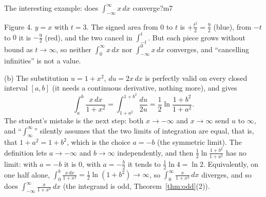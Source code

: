 \documentclass[11pt]{article}
\begin{document}
\begin{exmp}{The interesting example: does $\int_{-\infty}^\infty x\,dx$ converge?}{m7}
\begin{center}
\end{center}
\begin{center}\small Figure 4. $y=x$ with $t=3$. The signed area from $0$ to $t$ is $+\frac{t^2}2=\frac92$ (blue), from $-t$ to $0$ it is $-\frac92$ (red), and the two cancel in $\int_{-t}^t$. But each piece grows without bound as $t\to\infty$, so neither $\int_0^\infty x\,dx$ nor $\int_{-\infty}^0x\,dx$ converges, and ``cancelling infinities'' is not a value.\end{center}

(b) The substitution $u=1+x^2$, $du=2x\,dx$ is perfectly valid on every closed interval $[a,b]$ (it needs a continuous derivative, nothing more), and gives
\[\int_a^b\frac{x\,dx}{1+x^2}=\int_{1+a^2}^{1+b^2}\frac{du}{2u}=\frac12\ln\frac{1+b^2}{1+a^2}.\]
The student's mistake is the next step: both $x\to-\infty$ and $x\to\infty$ send $u$ to $\infty$, and ``$\int_\infty^\infty$'' silently assumes that the two limits of integration are equal, that is, that $1+a^2=1+b^2$, which is the choice $a=-b$ (the symmetric limit). The definition lets $a\to-\infty$ and $b\to\infty$ independently, and then $\frac12\ln\frac{1+b^2}{1+a^2}$ has no limit: with $a=-b$ it is $0$, with $a=-\frac b2$ it tends to $\frac12\ln4=\ln2$. Equivalently, on one half alone, $\int_0^b\frac{x\,dx}{1+x^2}=\frac12\ln(1+b^2)\to\infty$, so $\int_0^\infty\frac x{1+x^2}\,dx$ diverges, and so does $\int_{-\infty}^\infty\frac x{1+x^2}\,dx$ (the integrand is odd, Theorem~\ref{thm:odd}(2)).
\end{exmp}
\end{document}
